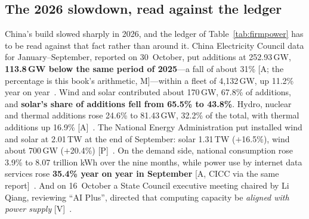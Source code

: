 \subsection{The 2026 slowdown, read against the ledger}
\label{sec:cap-china-slowdown}

China's build slowed sharply in 2026, and the ledger of Table~\ref{tab:firmpower} has to be read against that fact rather than around it. China Electricity Council data for January--September, reported on 30~October, put additions at 252.93\,GW, \textbf{113.8\,GW below the same period of 2025}---a fall of about 31\% [A; the percentage is this book's arithmetic, M]---within a fleet of 4,132\,GW, up 11.2\% year on year~\cite{cap-china-additions}. Wind and solar contributed about 170\,GW, 67.8\% of additions, and \textbf{solar's share of additions fell from 65.5\% to 43.8\%}. Hydro, nuclear and thermal additions rose 24.6\% to 81.43\,GW, 32.2\% of the total, with thermal additions up 16.9\% [A]~\cite{cap-china-additions}. The National Energy Administration put installed wind and solar at 2.01\,TW at the end of September: solar 1.31\,TW ($+$16.5\%), wind about 700\,GW ($+$20.4\%) [P]~\cite{cap-nea-sep}. On the demand side, national consumption rose 3.9\% to 8.07 trillion kWh over the nine months, while power use by internet data services rose \textbf{35.4\% year on year in September} [A, CICC via the same report]~\cite{cap-china-additions}. And on 16~October a State Council executive meeting chaired by Li Qiang, reviewing ``AI Plus'', directed that computing capacity be \emph{aligned with power supply} [V]~\cite{cap-state-council-oct}.

